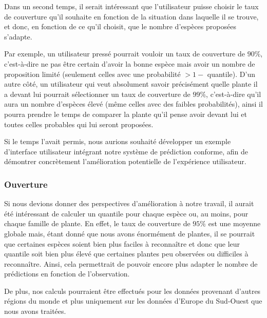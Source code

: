 \documentclass[a4paper,12pt]{article}
\begin{document}
\vspace{0.2cm}

Dans un second temps, il serait intéressant que l'utilisateur puisse choisir le taux de couverture qu'il souhaite en fonction de la situation dans laquelle il se trouve, et donc, en fonction de ce qu'il choisit, que le nombre d'espèces proposées s'adapte. 

\vspace{0.2cm}

Par exemple, un utilisateur pressé pourrait vouloir un taux de couverture de $90\%$, c'est-à-dire ne pas être certain d'avoir la bonne espèce mais avoir un nombre de proposition limité (seulement celles avec une probabilité $> 1 -$ quantile). D'un autre côté, un utilisateur qui veut absolument savoir précisément quelle plante il a devant lui pourrait sélectionner un taux de couverture de $99\%$, c'est-à-dire qu'il aura un nombre d'espèces élevé (même celles avec des faibles probabilités), ainsi il pourra prendre le temps de comparer la plante qu'il pense avoir devant lui et toutes celles probables qui lui seront proposées.

\vspace{0.2cm}

Si le temps l'avait permis, nous aurions souhaité développer un exemple d'interface utilisateur intégrant notre système de prédiction conforme, afin de démontrer concrètement l'amélioration potentielle de l'expérience utilisateur.

\subsubsection{Ouverture}

Si nous devions donner des perspectives d'amélioration à notre travail, il aurait été intéressant de calculer un quantile pour chaque espèce ou, au moins, pour chaque famille de plante. En effet, le taux de couverture de $95\%$ est une moyenne globale mais, étant donné que nous avons énormément de plantes, il se pourrait que certaines espèces soient bien plus faciles à reconnaître et donc que leur quantile soit bien plus élevé que certaines plantes peu observées ou difficiles à reconnaître. Ainsi, cela permettrait de pouvoir encore plus adapter le nombre de prédictions en fonction de l'observation.

\vspace{0.2cm}

De plus, nos calculs pourraient être effectués pour les données provenant d'autres régions du monde et plus uniquement sur les données d'Europe du Sud-Ouest que nous avons traitées.
\end{document}
